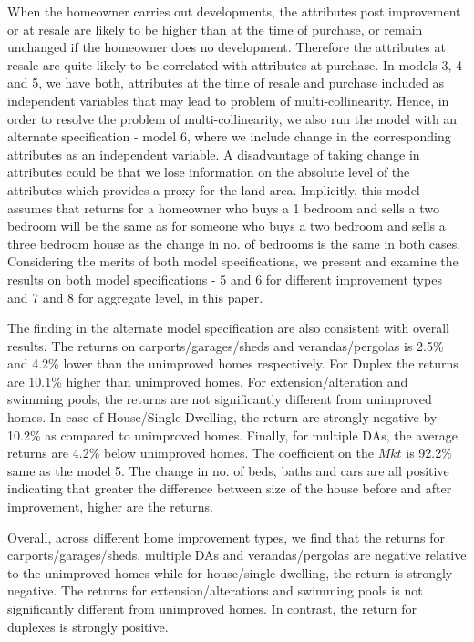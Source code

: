 \documentclass[AEJ,reqno, draftmode]{AEA} %
\begin{document}
When the homeowner carries out developments, the attributes post improvement or at resale are likely to be higher than at the time of purchase, or remain unchanged if the homeowner does no development. Therefore the attributes at resale are quite likely to be correlated with attributes at purchase. In models 3, 4 and 5, we have both, attributes at the time of resale and purchase included as independent variables that may lead to problem of multi-collinearity. Hence, in order to resolve the problem of multi-collinearity, we also run the model with an alternate specification - model 6, where we include change in the corresponding attributes as an independent variable. A disadvantage of taking change in attributes could be that we lose information on the absolute level of the attributes which provides a proxy for the land area. Implicitly, this model assumes that returns for a homeowner who buys a 1 bedroom and sells a two bedroom will be the same as for someone who buys a two bedroom and sells a three bedroom house as the change in no. of bedrooms is the same in both cases. Considering the merits of both model specifications, we present and examine the results on both model specifications - 5 and 6 for different improvement types and 7 and 8 for aggregate level, in this paper.

The finding in the alternate model specification are also consistent with overall results. The returns on carports/garages/sheds and verandas/pergolas is 2.5\% and 4.2\% lower than the unimproved homes respectively. For Duplex the returns are 10.1\% higher than unimproved homes. For extension/alteration and swimming pools, the returns are not significantly different from unimproved homes. In case of House/Single Dwelling, the return are strongly negative by 10.2\% as compared to unimproved homes. Finally, for multiple DAs, the average returns are 4.2\% below unimproved homes. The coefficient on the $Mkt$ is 92.2\% same as the model 5. The change in no. of beds, baths and cars are all positive indicating that greater the difference between size of the house before and after improvement, higher are the returns. 

Overall, across different home improvement types, we find that the returns for carports/garages/sheds, multiple DAs and verandas/pergolas are negative relative to the unimproved homes while for house/single dwelling, the return is strongly negative. The returns for extension/alterations and swimming pools is not significantly different from unimproved homes. In contrast, the return for duplexes is strongly positive.
\end{document}
